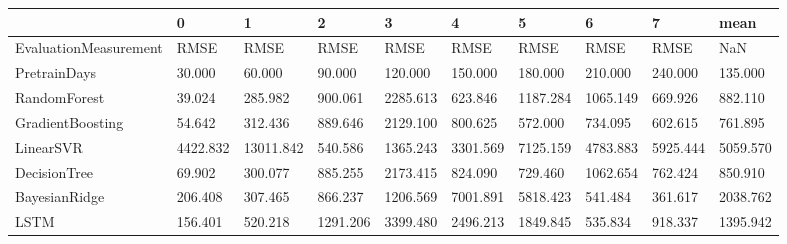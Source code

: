\begin{tabular}{llllllllll}
\toprule
{} &        0 &         1 &        2 &        3 &        4 &        5 &        6 &        7 &     mean \\
\midrule
EvaluationMeasurement &     RMSE &      RMSE &     RMSE &     RMSE &     RMSE &     RMSE &     RMSE &     RMSE &      NaN \\
PretrainDays          &   30.000 &    60.000 &   90.000 &  120.000 &  150.000 &  180.000 &  210.000 &  240.000 &  135.000 \\
RandomForest          &   39.024 &   285.982 &  900.061 & 2285.613 &  623.846 & 1187.284 & 1065.149 &  669.926 &  882.110 \\
GradientBoosting      &   54.642 &   312.436 &  889.646 & 2129.100 &  800.625 &  572.000 &  734.095 &  602.615 &  761.895 \\
LinearSVR             & 4422.832 & 13011.842 &  540.586 & 1365.243 & 3301.569 & 7125.159 & 4783.883 & 5925.444 & 5059.570 \\
DecisionTree          &   69.902 &   300.077 &  885.255 & 2173.415 &  824.090 &  729.460 & 1062.654 &  762.424 &  850.910 \\
BayesianRidge         &  206.408 &   307.465 &  866.237 & 1206.569 & 7001.891 & 5818.423 &  541.484 &  361.617 & 2038.762 \\
LSTM                  &  156.401 &   520.218 & 1291.206 & 3399.480 & 2496.213 & 1849.845 &  535.834 &  918.337 & 1395.942 \\
\bottomrule
\end{tabular}
